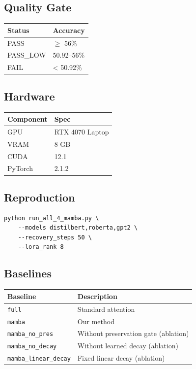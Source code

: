 \subsection{Quality Gate}

\begin{table}[H]
\centering
\small
\begin{tabular}{ll}
\toprule
\textbf{Status} & \textbf{Accuracy} \\
\midrule
PASS & $\ge$ 56\% \\
PASS\_LOW & 50.92--56\% \\
FAIL & < 50.92\% \\
\bottomrule
\end{tabular}
\end{table}

\subsection{Hardware}

\begin{table}[H]
\centering
\small
\begin{tabular}{ll}
\toprule
\textbf{Component} & \textbf{Spec} \\
\midrule
GPU & RTX 4070 Laptop \\
VRAM & 8 GB \\
CUDA & 12.1 \\
PyTorch & 2.1.2 \\
\bottomrule
\end{tabular}
\end{table}

\subsection{Reproduction}

\begin{lstlisting}
python run_all_4_mamba.py \
    --models distilbert,roberta,gpt2 \
    --recovery_steps 50 \
    --lora_rank 8
\end{lstlisting}

\subsection{Baselines}

\begin{table}[H]
\centering
\small
\begin{tabular}{ll}
\toprule
\textbf{Baseline} & \textbf{Description} \\
\midrule
\texttt{full} & Standard attention \\
\texttt{mamba} & Our method \\
\texttt{mamba\_no\_pres} & Without preservation gate (ablation) \\
\texttt{mamba\_no\_decay} & Without learned decay (ablation) \\
\texttt{mamba\_linear\_decay} & Fixed linear decay (ablation) \\
\bottomrule
\end{tabular}
\end{table}

